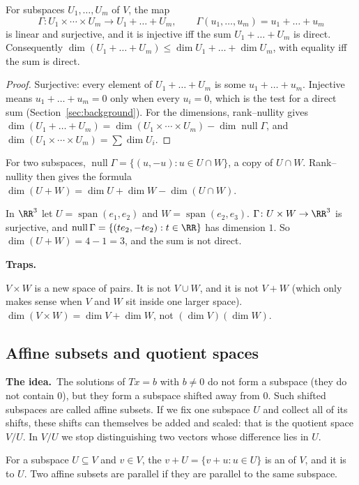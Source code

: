 \documentclass[10pt]{scrartcl}
\DeclareMathOperator{\nul}{null}
\DeclareMathOperator{\spn}{span}
\newcommand{\traps}{\par\medskip\noindent\textbf{\color{RawSienna}Traps.}\ }
\newcommand{\idea}{\par\noindent\textbf{\color{MidnightBlue}The idea.}\ }
\begin{document}
\begin{proposition*}
  For subspaces $U_1,\dots,U_m$ of $V$, the map
  \[ \Gamma\colon U_1\times\cdots\times U_m\to U_1+\dots+U_m,\qquad\Gamma(u_1,\dots,u_m)=u_1+\dots+u_m \]
  is linear and surjective, and it is injective iff the sum $U_1+\dots+U_m$ is direct. Consequently $\dim(U_1+\dots+U_m)\le\dim U_1+\dots+\dim U_m$, with equality iff the sum is direct.
\end{proposition*}
\begin{proof}
  Surjective: every element of $U_1+\dots+U_m$ is some $u_1+\dots+u_m$. Injective means $u_1+\dots+u_m=0$ only when every $u_i=0$, which is the test for a direct sum (Section~\ref{sec:background}). For the dimensions, rank--nullity gives $\dim(U_1+\dots+U_m)=\dim(U_1\times\cdots\times U_m)-\dim\nul\Gamma$, and $\dim(U_1\times\cdots\times U_m)=\sum\dim U_i$.
\end{proof}
For two subspaces, $\nul\Gamma=\{(u,-u):u\in U\cap W\}$, a copy of $U\cap W$. Rank--nullity then gives the formula $\dim(U+W)=\dim U+\dim W-\dim(U\cap W)$.

\begin{example*}
  In $\RR^3$ let $U=\spn(e_1,e_2)$ and $W=\spn(e_2,e_3)$. $\Gamma\colon U\times W\to\RR^3$ is surjective, and $\nul\Gamma=\{(te_2,-te_2):t\in\RR\}$ has dimension $1$. So $\dim(U+W)=4-1=3$, and the sum is not direct.
\end{example*}

\traps
\begin{itemize}
  \ii $V\times W$ is a new space of pairs. It is not $V\cup W$, and it is not $V+W$ (which only makes sense when $V$ and $W$ sit inside one larger space).
  \ii $\dim(V\times W)=\dim V+\dim W$, not $(\dim V)(\dim W)$.
\end{itemize}

\subsection{Affine subsets and quotient spaces}\label{sec:quotient}
\idea The solutions of $Tx=b$ with $b\ne0$ do not form a subspace (they do not contain $0$), but they form a subspace shifted away from $0$. Such shifted subspaces are called affine subsets. If we fix one subspace $U$ and collect all of its shifts, these shifts can themselves be added and scaled: that is the quotient space $V/U$. In $V/U$ we stop distinguishing two vectors whose difference lies in $U$.

\begin{definition*}
  For a subspace $U\subseteq V$ and $v\in V$, the  $v+U=\{v+u:u\in U\}$ is an  of $V$, and it is  to $U$. Two affine subsets are parallel if they are parallel to the same subspace.
\end{definition*}
\end{document}
